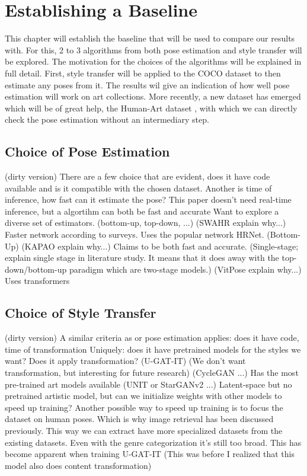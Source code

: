 \chapter{Establishing a Baseline}
\label{chap:baseline}
This chapter will establish the baseline that will be used to compare our results with.
For this, 2 to 3 algorithms from both pose estimation and style transfer will be explored.
The motivation for the choices of the algorithms will be explained in full detail.
First, style transfer will be applied to the COCO dataset to then estimate any poses from it.
The results wil give an indication of how well pose estimation will work on art collections.
More recently, a new dataset has emerged which will be of great help, the Human-Art dataset \cite{Ju2023}, with which we can directly check the pose estimation without an intermediary step.

\section{Choice of Pose Estimation}
\label{sec:baseline_pose_estimation}
(dirty version)
There are a few choice that are evident, does it have code available and is it compatible with the chosen dataset.
Another is time of inference, how fast can it estimate the pose? This paper doesn't need real-time inference, but a algortihm can both be fast and accurate \cite{William2021}
Want to explore a diverse set of estimators. (bottom-up, top-down, ...)
(SWAHR explain why...) \cite{SWARH} Faster network according to surveys. Uses the popular network HRNet. (Bottom-Up)
(KAPAO explain why...) \cite{William2021} Claims to be both fast and accurate. (Single-stage; explain single stage in literature study. It means that it does away with the top-down/bottom-up paradigm which are two-stage models.)
(VitPose explain why...) \cite{vitpose} Uses transformers

\section{Choice of Style Transfer}
\label{sec:baseline_style_transfer}
(dirty version)
A similar criteria as or pose estimation applies: does it have code, time of transformation
Uniquely: does it have pretrained models for the styles we want?
Does it apply transformation? (U-GAT-IT) (We don't want transformation, but interesting for future research)
(CycleGAN ...) \cite{Zhu2017} Has the most pre-trained art models available
(UNIT or StarGANv2 ...) \cite{Liu2017} Latent-space but no pretrained artistic model, but can we initialize weights with other models to speed up training?
Another possible way to speed up training is to focus the dataset on human poses.
Which is why image retrieval has been discussed previously.
This way we can extract have more specialized datasets from the existing datasets.
Even with the genre categorization it's still too broad.
This has become apparent when training U-GAT-IT (This was before I realized that this model also does content transformation)


